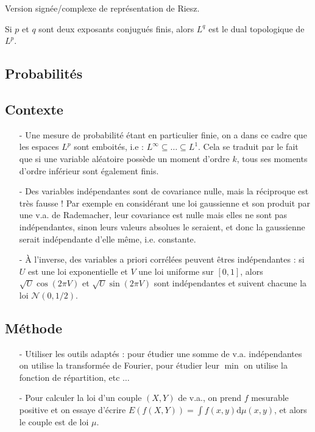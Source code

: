 \documentclass[11pt,a4paper]{article}
\begin{document}
\begin{thmstar}

\end{thmstar}

\begin{rmq}
Version signée/complexe de représentation de Riesz.
\end{rmq}

\begin{thmstar}[Dualité]
Si $p$ et $q$ sont deux exposants conjugués finis, alors $L^q$ est le dual topologique de $L^p$.
\end{thmstar}



\newpage
\begin{center}
\section*{Probabilités} 
\end{center}

\subsection*{Contexte}
\begin{itemize}
\item[-] Une mesure de probabilité étant en particulier finie, on a dans ce cadre que les espaces $L^p$ sont emboités, i.e : $L^\infty \subseteq \dots \subseteq L^1$. Cela se traduit par le fait que si une variable aléatoire possède un moment d'ordre $k$, tous ses moments d'ordre inférieur sont également finis.
\item[-] Des variables indépendantes sont de covariance nulle, mais la réciproque est très fausse ! Par exemple en considérant une loi gaussienne et son produit par une v.a. de Rademacher, leur covariance est nulle mais elles ne sont pas indépendantes, sinon leurs valeurs absolues le seraient, et donc la gaussienne serait indépendante d'elle même, i.e. constante.
\item[-] À l'inverse, des variables a priori corrélées peuvent êtres indépendantes : si $U$ est une loi exponentielle et $V$ une loi uniforme sur $[0,1]$, alors $\sqrt{U}\cos(2\pi V)$ et $\sqrt{U}\sin(2\pi V)$ sont indépendantes et suivent chacune la loi $\mathcal{N}(0,1/2)$.
\end{itemize}

\subsection*{Méthode}
\begin{itemize}
\item[-] Utiliser les outils adaptés : pour étudier une somme de v.a. indépendantes on utilise la transformée de Fourier, pour étudier leur $\min$ on utilise la fonction de répartition, etc $\dots$
\item[-] Pour calculer la loi d'un couple $(X,Y)$ de v.a., on prend $f$ mesurable positive et on essaye d'écrire $\displaystyle E\left(f(X,Y)\right) = \int f(x,y) \mathrm{d}\mu(x,y)$, et alors le couple est de loi $\mu$.
\end{itemize}
\end{document}

